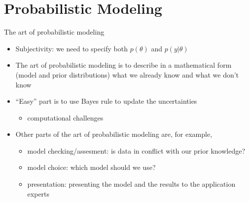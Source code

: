 \documentclass[10pt]{beamer}
\begin{document}
\section{Probabilistic Modeling}
\frame{\sectionpage}

\begin{frame}{The art of probabilistic modeling}
  \begin{itemize}
  \item Subjectivity: we need to specify both $p(\theta)$ and $p(y|\theta)$
  \item The art of probabilistic modeling is to describe in a
    mathematical form (model and prior distributions) what we already
    know and what we don't know
\vspace{\baselineskip}
  \item<2-> ``Easy'' part is to use Bayes rule to update the uncertainties
    \begin{itemize}
    \item computational challenges
    \end{itemize}
\vspace{\baselineskip}
  \item<3-> Other parts of the art of probabilistic modeling are, for example,
    \begin{itemize}
    \item model checking/assesment: is data in conflict with our prior knowledge?
    \item model choice: which model should we use?
    \item presentation: presenting the model and the results to the application experts
    \end{itemize}
  \end{itemize}
\end{frame}
\end{document}
